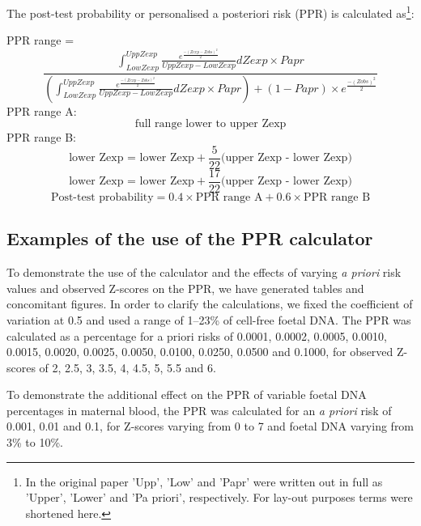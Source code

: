 The post-test probability or personalised a posteriori risk (PPR) is calculated as\footnote{In the original paper 'Upp', 'Low' and 'Papr' were written out in full as 'Upper', 'Lower' and 'Pa priori', respectively. For lay-out purposes terms were shortened here.}:

\vspace{2mm}
\textrm{PPR range} = 
\begin{equation*}
	\frac{\int^{Upp Zexp}_{Low Zexp}\frac{e^\frac{-(Zexp - Zobs)^2}{2}}{Upp Zexp - Low Zexp}dZexp \times Papr}{(\int^{Upp Zexp}_{Low Zexp}\frac{e^\frac{-(Zexp - Zobs)^2}{2}}{Upp Zexp - Low Zexp}dZexp \times Papr) + (1 - Papr) \times e^{\frac{-(Zobs)^2}{2}}}
\end{equation*}
\vspace{0mm}
PPR range A:
\begin{equation*}
	\textrm{full range lower to upper Zexp}
\end{equation*}
\vspace{0mm}
PPR range B: 
\begin{equation*}
	\textrm{lower Zexp = lower Zexp} + \frac{5}{22}\textrm{(upper Zexp - lower Zexp)}
\end{equation*}
\begin{equation*}
	\textrm{lower Zexp = lower Zexp} +\frac{17}{22}\textrm{(upper Zexp - lower Zexp)}
\end{equation*}
\vspace{1mm}
\begin{equation*}
	\textrm{Post-test probability} = 0.4 \times \textrm{PPR range A} + 0.6 \times \textrm{PPR range B}
\end{equation*}

\subsection{Examples of the use of the PPR calculator}
To demonstrate the use of the calculator and the effects of varying \textsl{a priori} risk values and observed Z-scores on the PPR, we have generated tables and concomitant figures. 
In order to clarify the calculations, we fixed the coefficient of variation at 0.5 and used a range of 1–23\% of cell-free foetal DNA. The PPR was calculated as a percentage for a priori risks of 0.0001, 0.0002, 0.0005, 0.0010, 0.0015, 0.0020, 0.0025, 0.0050, 0.0100, 0.0250, 0.0500 and 0.1000, for observed Z-scores of 2, 2.5, 3, 3.5, 4, 4.5, 5, 5.5 and 6.

To demonstrate the additional effect on the PPR of variable foetal DNA percentages in maternal blood, the PPR was calculated for an \textsl{a priori} risk of 0.001, 0.01 and 0.1, for Z-scores varying from 0 to 7 and foetal DNA varying from 3\% to 10\%.

